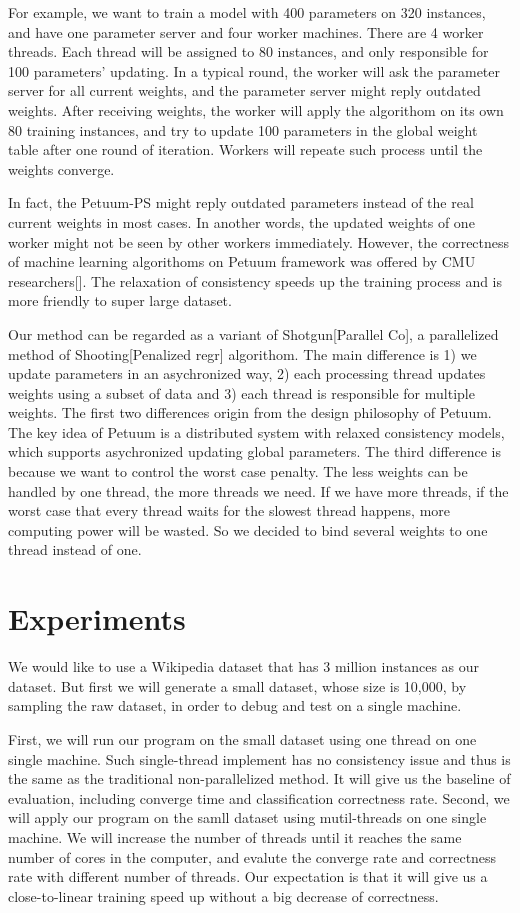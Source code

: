 \documentclass{article} %
\begin{document}
For example, we want to train a model with 400 parameters on 320 instances, and have one parameter server and four worker machines. There are 4 worker threads. Each thread will be assigned to 80 instances, and only responsible for 100 parameters' updating. In a typical round, the worker will ask the parameter server for all current weights, and the parameter server might reply outdated weights. After receiving weights, the worker will apply the algorithom on its own 80 training instances, and try to update 100 parameters in the global weight table after one round of iteration. Workers will repeate such process until the weights converge.

In fact, the Petuum-PS might reply outdated parameters instead of the real current weights in most cases. In another words, the updated weights of one worker might not be seen by other workers immediately. However, the correctness of machine learning algorithoms on Petuum framework was offered by CMU researchers[]. The relaxation of consistency speeds up the training process and is more friendly to super large dataset.

Our method can be regarded as a variant of Shotgun[Parallel Co], a parallelized method of Shooting[Penalized regr] algorithom. The main difference is 1) we update parameters in an asychronized way, 2) each processing thread updates weights using a subset of data and 3) each thread is responsible for multiple weights. The first two differences origin from the design philosophy of Petuum. The key idea of Petuum is a distributed system with relaxed consistency models, which supports asychronized updating global parameters. The third difference is because we want to control the worst case penalty. The less weights can be handled by one thread, the more threads we need. If we have more threads, if the worst case that every thread waits for the slowest thread happens, more computing power will be wasted. So we decided to bind several weights to one thread instead of one. 

 
\section{Experiments}
\label{others}
We would like to use a Wikipedia dataset that has 3 million instances as our dataset. But first we will generate a small dataset, whose size is 10,000, by sampling the raw dataset, in order to debug and test on a single machine.

First, we will run our program on the small dataset using one thread on one single machine. Such single-thread implement has no consistency issue and thus is the same as the traditional non-parallelized method. It will give us the baseline of evaluation, including converge time and classification correctness rate. Second, we will apply our program on the samll dataset using mutil-threads on one single machine. We will increase the number of threads until it reaches the same number of cores in the computer, and evalute the converge rate and correctness rate with different number of threads. Our expectation is that it will give us a close-to-linear training speed up without a big decrease of correctness.
\end{document}

